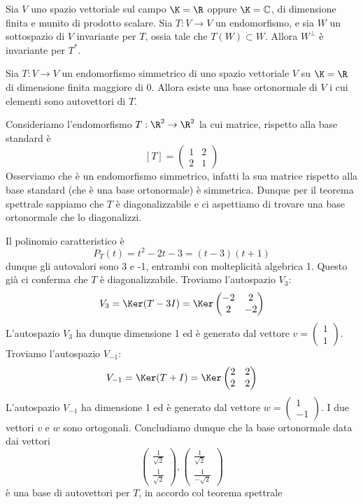 \begin{lemma}
	Sia $V$ uno spazio vettoriale sul campo $\K = \R$ oppure
	$\K = \mathbb{C}$, di dimensione finita e munito di prodotto scalare.
	Sia $T : V \to V$ un endomorfismo, e sia $W$ un sottospazio di $V$ invariante
	per $T$, ossia tale che $T(W) \subset W$. Allora $W^\perp$ è invariante per
	$T^*$.
\end{lemma}

\begin{theorem}
	Sia $T : V  \to V$ un endomorfismo simmetrico di uno spazio vettoriale $V$ su
	$\K = \R$ di dimensione finita maggiore di 0. Allora esiste una
	base ortonormale di $V$ i cui elementi sono autovettori di $T$.
\end{theorem}

\begin{example}
	Consideriamo l'endomorfismo $T : \R^2 \to \R^2$ la cui matrice,
	rispetto alla base standard è
	\[
		[T] = \begin{pmatrix}
			1 & 2 \\
			2 & 1
		\end{pmatrix}
	\]
	Osserviamo che è un endomorfismo simmetrico, infatti la sua matrice rispetto
	alla base standard (che è una base ortonormale) è simmetrica. Dunque per
	il teorema spettrale sappiamo che $T$ è diagonalizzabile e ci aspettiamo di
	trovare una base ortonormale che lo diagonalizzi.

	Il polinomio caratteristico è
	\[
		P_T(t) = t^2 - 2t - 3 = (t - 3)(t + 1)
	\]
	dunque gli autovalori sono 3 e -1, entrambi con molteplicità algebrica 1.
	Questo già ci conferma che $T$ è diagonalizzabile. Troviamo l'autospazio
	$V_3$:
	\[
		V_3 = \Ker(T - 3I) = \Ker \begin{pmatrix}
			-2 & 2  \\
			2  & -2
		\end{pmatrix}
	\]
	L'autospazio $V_3$ ha dunque dimensione 1 ed è generato dal vettore
	$v = \begin{pmatrix} 1 \\ 1	\end{pmatrix}$. Troviamo l'autospazio $V_{-1}$:
	\[
		V_{-1} = \Ker(T + I) = \Ker \begin{pmatrix}
			2 & 2 \\
			2 & 2
		\end{pmatrix}
	\]
	L'autospazio $V_{-1}$ ha dimensione 1 ed è generato dal vettore
	$w = \begin{pmatrix} 1 \\ -1 \end{pmatrix}$. I due vettori $v$ e $w$ sono
	ortogonali. Concludiamo dunque che la base ortonormale data dai vettori
	\[
		\begin{pmatrix}
			\frac{1}{\sqrt{2}} \\ \frac{1}{\sqrt{2}}
		\end{pmatrix},
		\begin{pmatrix}
			\frac{1}{\sqrt{2}} \\ \frac{1}{-\sqrt{2}}
		\end{pmatrix}
	\]
	è una base di autovettori per $T$, in accordo col teorema spettrale
\end{example}

